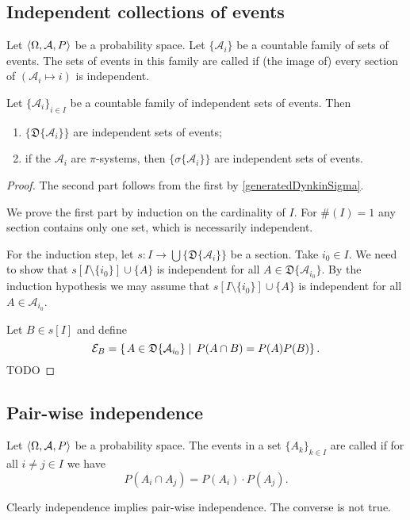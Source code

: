 \subsection{Independent collections of events}
\begin{definition}
Let $\left\langle \Omega, \mathcal{A}, P \right\rangle$ be a probability space. Let $\{\mathcal{A}_i\}$ be a countable family of sets of events. The sets of events in this family are called  if (the image of) every section of $(\mathcal{A}_i\mapsto i)$ is independent.
\end{definition}

\begin{proposition}
Let $\{\mathcal{A}_i\}_{i\in I}$ be a countable family of independent sets of events. Then
\begin{enumerate}
\item $\{\mathfrak{D}\{\mathcal{A}_i\}\}$ are independent sets of events;
\item if the $\mathcal{A}_i$ are $\pi$-systems, then $\{\sigma\{\mathcal{A}_i\}\}$ are independent sets of events.
\end{enumerate}
\end{proposition}
\begin{proof}
The second part follows from the first by \ref{generatedDynkinSigma}.

We prove the first part by induction on the cardinality of $I$. For $\#(I) = 1$ any section contains only one set, which is necessarily independent.

For the induction step, let $s: I \to \bigcup \{\mathfrak{D}\{\mathcal{A}_i\}\}$ be a section. Take $i_0\in I$. We need to show that $s[I\setminus \{i_0\}]\cup \{A\}$ is independent for all $A\in \mathfrak{D}\{\mathcal{A}_{i_0}\}$. By the induction hypothesis we may assume that $s[I\setminus \{i_0\}]\cup \{A\}$ is independent for all $A\in \mathcal{A}_{i_0}$.

Let $B\in s[I]$ and define 
\[ \mathcal{E}_B = \left\{\left. A\in \mathfrak{D}\{\mathcal{A}_{i_0}\} \;\right|\; P(A\cap B) = P(A)P(B) \right\}. \]
TODO
\end{proof}

\subsection{Pair-wise independence}
\begin{definition}
Let $\left\langle \Omega, \mathcal{A}, P \right\rangle$ be a probability space. The events in a set $\{A_k\}_{k\in I}$ are called  if for all $i\neq j \in I$ we have
\[ P\left(A_i \cap A_j\right) = P(A_i)\cdot P(A_j). \]
\end{definition}
Clearly independence implies pair-wise independence. The converse is not true.


